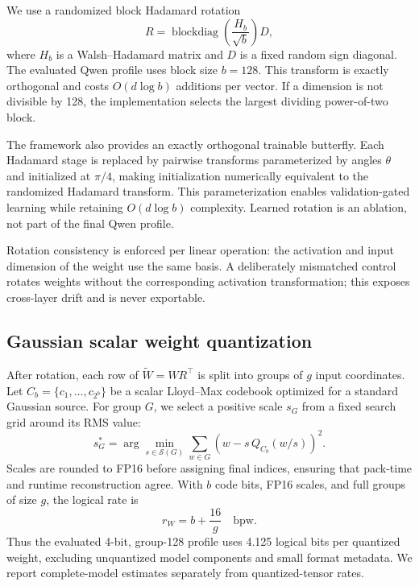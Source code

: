 \documentclass[10pt,twocolumn]{article}
\newcommand{\bpw}{\mathrm{bpw}}
\begin{document}
We use a randomized block Hadamard rotation
\begin{equation}
  R = \operatorname{blockdiag}\!\left(\frac{H_b}{\sqrt{b}}\right)D,
\end{equation}
where $H_b$ is a Walsh--Hadamard matrix and $D$ is a fixed random sign
diagonal. The evaluated Qwen profile uses block size $b=128$. This transform is
exactly orthogonal and costs $O(d\log b)$ additions per vector. If a dimension
is not divisible by 128, the implementation selects the largest dividing
power-of-two block.

The framework also provides an exactly orthogonal trainable butterfly. Each
Hadamard stage is replaced by pairwise transforms parameterized by angles
$\theta$ and initialized at $\pi/4$, making initialization numerically
equivalent to the randomized Hadamard transform. This parameterization enables
validation-gated learning while retaining $O(d\log b)$ complexity. Learned
rotation is an ablation, not part of the final Qwen profile.

Rotation consistency is enforced per linear operation: the activation and
input dimension of the weight use the same basis. A deliberately mismatched
control rotates weights without the corresponding activation transformation;
this exposes cross-layer drift and is never exportable.

\subsection{Gaussian scalar weight quantization}

After rotation, each row of $\widetilde W=WR^{\top}$ is split into groups of
$g$ input coordinates. Let $C_b=\{c_1,\ldots,c_{2^b}\}$ be a scalar Lloyd--Max
codebook optimized for a standard Gaussian source. For group $G$, we select a
positive scale $s_G$ from a fixed search grid around its RMS value:
\begin{equation}
  s_G^* = \arg\min_{s\in\mathcal{S}(G)}
  \sum_{w\in G}\left(w-s\,Q_{C_b}(w/s)\right)^2.
  \label{eq:scale-search}
\end{equation}
Scales are rounded to FP16 before assigning final indices, ensuring that
pack-time and runtime reconstruction agree. With $b$ code bits, FP16 scales,
and full groups of size $g$, the logical rate is
\begin{equation}
  r_W = b + \frac{16}{g}\quad\bpw.
  \label{eq:weight-rate}
\end{equation}
Thus the evaluated 4-bit, group-128 profile uses 4.125 logical bits per
quantized weight, excluding unquantized model components and small format
metadata. We report complete-model estimates separately from quantized-tensor
rates.
\end{document}
